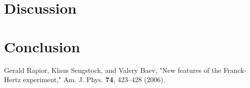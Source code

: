 \documentclass[prb,preprint]{revtex4-1}
\begin{document}
\section{Discussion}










\section{Conclusion}


\begin{thebibliography}{3}

 Gerald Rapior, Klaus Sengstock, and Valery Baev, "New features of the Franck-Hertz experiment," Am. J. Phys. {\bf 74}, 423--428 (2006).

\end{thebibliography}
\end{document}
